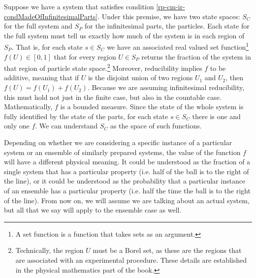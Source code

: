 Suppose we have a system that satisfies condition  \ref{rp-cm-ir-condMadeOfInfinitesimalParts}. Under this premise, we have two state spaces: $S_C$ for the full system and $S_P$ for the infinitesimal parts, the particles. Each state for the full system must tell us exactly how much of the system is in each region of $S_P$. That is, for each state $s \in S_C$ we have an associated real valued set function\footnote{A set function is a function that takes sets as an argument.} $f(U) \in [0,1]$ that for every region $U \in S_P$ returns the fraction of the system in that region of particle state space.\footnote{Technically, the region $U$ must be a Borel set, as these are the regions that are associated with an experimental procedure. These details are established in the physical mathematics part of the book.} Moreover, reducibility implies $f$ to be additive, meaning that if $U$ is the disjoint union of two regions $U_1$ and $U_2$, then $f(U) = f(U_1) + f(U_2)$. Because we are assuming infinitesimal reducibility, this must hold not just in the finite case, but also in the countable case. Mathematically, $f$ is a bounded measure. Since the state of the whole system is fully identified by the state of the parts, for each state $s \in S_C$ there is one and only one $f$. We can understand $S_C$ as the space of such functions.

Depending on whether we are considering a specific instance of a particular system or an ensemble of similarly prepared systems, the value of the function $f$ will have a different physical meaning. It could be understood as the fraction of a single system that has a particular property (i.e. half of the ball is to the right of the line), or it could be understood as the probability that a particular instance of an ensemble has a particular property (i.e. half the time the ball is to the right of the line). From now on, we will assume we are talking about an actual system, but all that we say will apply to the ensemble case as well.

